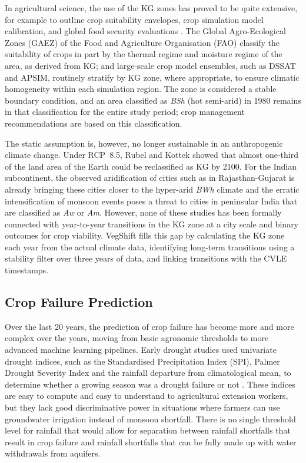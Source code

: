\documentclass{ieeeaccess}
\begin{document}
In agricultural science, the use of the KG zones has proved to be quite extensive, for example to outline crop suitability envelopes, crop simulation model calibration, and global food security evaluations \cite{zabel2014}. The Global Agro-Ecological Zones (GAEZ) of the Food and Agriculture Organisation (FAO) classify the suitability of crops in part by the thermal regime and moisture regime of the area, as derived from KG; and large-scale crop model ensembles, such as DSSAT and APSIM, routinely stratify by KG zone, where appropriate, to ensure climatic homogeneity within each simulation region. The zone is considered a stable boundary condition, and an area classified as \textit{BSh} (hot semi-arid) in 1980 remains in that classification for the entire study period; crop management recommendations are based on this classification.

The static assumption is, however, no longer sustainable in an anthropogenic climate change. Under RCP~8.5, Rubel and Kottek \cite{rubel2010} showed that almost one-third of the land area of the Earth could be reclassified as KG by 2100. For the Indian subcontinent, the observed aridification of cities such as in Rajasthan-Gujarat is already bringing these cities closer to the hyper-arid \textit{BWh} climate and the erratic intensification of monsoon events poses a threat to cities in peninsular India that are classified as \textit{Aw} or \textit{Am}. However, none of these studies has been formally connected with year-to-year transitions in the KG zone at a city scale and binary outcomes for crop viability. VegShift fills this gap by calculating the KG zone each year from the actual climate data, identifying long-term transitions using a stability filter over three years of data, and linking transitions with the CVLE timestamps.

\subsection{Crop Failure Prediction}
Over the last 20 years, the prediction of crop failure has become more and more complex over the years, moving from basic agronomic thresholds to more advanced machine learning pipelines. Early drought studies used univariate drought indices, such as the Standardised Precipitation Index (SPI), Palmer Drought Severity Index and the rainfall departure from climatological mean, to determine whether a growing season was a drought failure or not \cite{lobell2007}. These indices are easy to compute and easy to understand to agricultural extension workers, but they lack good discriminative power in situations where farmers can use groundwater irrigation instead of monsoon shortfall. There is no single threshold level for rainfall that would allow for separation between rainfall shortfalls that result in crop failure and rainfall shortfalls that can be fully made up with water withdrawals from aquifers.
\end{document}
